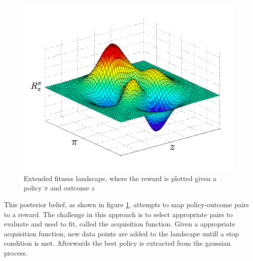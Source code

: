 \begin{figure}[ht]
  \centering
  \includegraphics[scale=0.5]{images/fitness-landscape.png}
  \caption{Extended fitness landscape, where the reward is plotted given a policy $\pi$ and outcome $z$}\label{fitnesslandscape}
\end{figure}

This posterior belief, as shown in figure \ref{fitnesslandscape}, attempts to map policy-outcome pairs to a reward. The challenge in this approach is to select appropriate pairs to evaluate and used to fit, called the acquisition function. Given a appropriate acquisition function, new data points are added to the landscape untill a stop condition is met. Afterwards the best policy is extracted from the gaussian process. 





